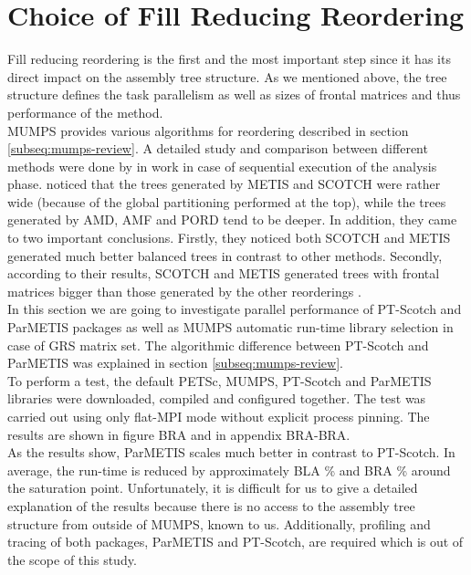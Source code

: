 \section{Choice of Fill Reducing Reordering}
\label{subseq:fill-in-reordering}

Fill reducing reordering is the first and the most important step since it has its direct impact on the assembly tree structure. As we mentioned above, the tree structure defines the task parallelism as well as sizes of frontal matrices and thus performance of the method.\\

MUMPS provides various algorithms for reordering described in section \ref{subseq:mumps-review}. A detailed study and comparison between different methods were done by \citeauthor{guermouche2003memory} in work \cite{guermouche2003memory} in case of sequential execution of the analysis phase. \citeauthor{guermouche2003memory} noticed that the trees generated by METIS and SCOTCH were rather wide (because of the global partitioning performed at the top), while the trees generated by AMD, AMF and PORD tend to be deeper. In addition, they came to two important conclusions. Firstly, they noticed both SCOTCH and METIS generated much better balanced trees in contrast to other methods. Secondly, according to their results, SCOTCH and METIS generated trees with frontal matrices bigger than those generated by the other reorderings \cite{guermouche2003memory}.\\


In this section we are going to investigate parallel performance of PT-Scotch and ParMETIS packages as well as MUMPS automatic run-time library selection in case of GRS matrix set. The algorithmic difference between PT-Scotch and ParMETIS was explained in section \ref{subseq:mumps-review}.\\


To perform a test, the default PETSc, MUMPS, PT-Scotch and ParMETIS libraries were downloaded, compiled and configured together. The test was carried out using only flat-MPI mode without explicit process pinning. The results are shown in figure BRA and in appendix BRA-BRA.\\


As the results show, ParMETIS scales much better in contrast to PT-Scotch. In average, the run-time is reduced by approximately BLA \% and BRA \% around the saturation point. Unfortunately, it is difficult for us to give a detailed explanation of the results because there is no access to the assembly tree structure from outside of MUMPS, known to us. Additionally, profiling and tracing of both packages, ParMETIS and PT-Scotch, are required which is out of the scope of this study.\\